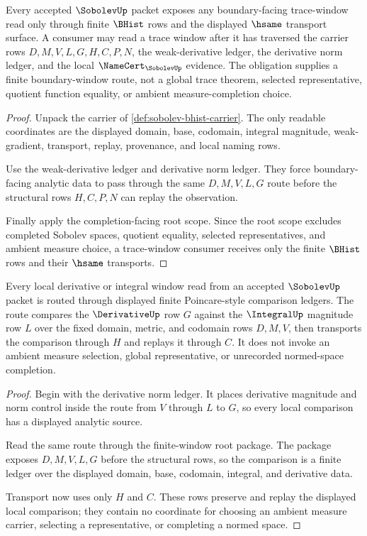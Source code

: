 \begin{theorem}
\label{thm:sobolev-trace-window-obligation}
Every accepted $\SobolevUp$ packet exposes any boundary-facing trace-window read only through finite $\BHist$ rows and the displayed $\hsame$ transport surface. A consumer may read a trace window after it has traversed the carrier rows $D,M,V,L,G,H,C,P,N$, the weak-derivative ledger, the derivative norm ledger, and the local $\NameCert_{\SobolevUp}$ evidence. The obligation supplies a finite boundary-window route, not a global trace theorem, selected representative, quotient function equality, or ambient measure-completion choice.
\end{theorem}
\begin{proof}
Unpack the carrier of \autoref{def:sobolev-bhist-carrier}. The only readable coordinates are the displayed domain, base, codomain, integral magnitude, weak-gradient, transport, replay, provenance, and local naming rows.

Use the weak-derivative ledger and derivative norm ledger. They force boundary-facing analytic data to pass through the same $D,M,V,L,G$ route before the structural rows $H,C,P,N$ can replay the observation.

Finally apply the completion-facing root scope. Since the root scope excludes completed Sobolev spaces, quotient equality, selected representatives, and ambient measure choice, a trace-window consumer receives only the finite $\BHist$ rows and their $\hsame$ transports.
\end{proof}

\begin{theorem}
\label{thm:sobolev-local-poincare-ledger}
Every local derivative or integral window read from an accepted $\SobolevUp$ packet is routed through displayed finite Poincare-style comparison ledgers. The route compares the $\DerivativeUp$ row $G$ against the $\IntegralUp$ magnitude row $L$ over the fixed domain, metric, and codomain rows $D,M,V$, then transports the comparison through $H$ and replays it through $C$. It does not invoke an ambient measure selection, global representative, or unrecorded normed-space completion.
\end{theorem}
\begin{proof}
Begin with the derivative norm ledger. It places derivative magnitude and norm control inside the route from $V$ through $L$ to $G$, so every local comparison has a displayed analytic source.

Read the same route through the finite-window root package. The package exposes $D,M,V,L,G$ before the structural rows, so the comparison is a finite ledger over the displayed domain, base, codomain, integral, and derivative data.

Transport now uses only $H$ and $C$. These rows preserve and replay the displayed local comparison; they contain no coordinate for choosing an ambient measure carrier, selecting a representative, or completing a normed space.
\end{proof}

